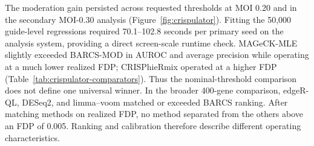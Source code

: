The moderation gain persisted across requested thresholds at MOI 0.20 and in
the secondary MOI-0.30 analysis (Figure~\ref{fig:crispulator}).  Fitting the
50,000 guide-level regressions required 70.1--102.8 seconds per primary seed
on the analysis system, providing a direct screen-scale runtime check.
MAGeCK-MLE slightly exceeded BARCS-MOD in AUROC and average precision while
operating at a much lower realized FDP; CRISPhieRmix operated at a higher FDP
(Table~\ref{tab:crispulator-comparators}).  Thus the nominal-threshold
comparison does not define one universal winner.  In the broader 400-gene
comparison, edgeR-QL, DESeq2, and limma--voom matched or exceeded BARCS
ranking.  After matching methods on realized FDP, no method separated from
the others above an FDP of 0.005.  Ranking and calibration therefore describe
different operating characteristics.
